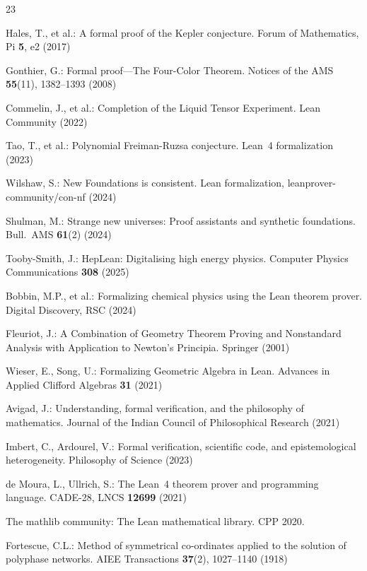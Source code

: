 \documentclass[runningheads]{llncs}
\begin{document}
\begin{thebibliography}{23}

Hales, T., et al.: A formal proof of the Kepler conjecture.
Forum of Mathematics, Pi \textbf{5}, e2 (2017)

Gonthier, G.: Formal proof---The Four-Color Theorem.
Notices of the AMS \textbf{55}(11), 1382--1393 (2008)

Commelin, J., et al.: Completion of the Liquid Tensor Experiment.
Lean Community (2022)

Tao, T., et al.: Polynomial Freiman-Ruzsa conjecture.
Lean~4 formalization (2023)

Wilshaw, S.: New Foundations is consistent.
Lean formalization, leanprover-community/con-nf (2024)

Shulman, M.: Strange new universes: Proof assistants and synthetic foundations.
Bull.\ AMS \textbf{61}(2) (2024)

Tooby-Smith, J.: HepLean: Digitalising high energy physics.
Computer Physics Communications \textbf{308} (2025)

Bobbin, M.P., et al.: Formalizing chemical physics using the Lean theorem prover.
Digital Discovery, RSC (2024)

Fleuriot, J.: A Combination of Geometry Theorem Proving and Nonstandard
Analysis with Application to Newton's Principia. Springer (2001)

Wieser, E., Song, U.: Formalizing Geometric Algebra in Lean.
Advances in Applied Clifford Algebras \textbf{31} (2021)

Avigad, J.: Understanding, formal verification, and the philosophy of mathematics.
Journal of the Indian Council of Philosophical Research (2021)

Imbert, C., Ardourel, V.: Formal verification, scientific code, and
epistemological heterogeneity. Philosophy of Science (2023)

de Moura, L., Ullrich, S.: The Lean~4 theorem prover and programming language.
CADE-28, LNCS \textbf{12699} (2021)

The mathlib community: The Lean mathematical library. CPP 2020.

Fortescue, C.L.: Method of symmetrical co-ordinates applied to the solution
of polyphase networks. AIEE Transactions \textbf{37}(2), 1027--1140 (1918)


\end{thebibliography}
\end{document}
